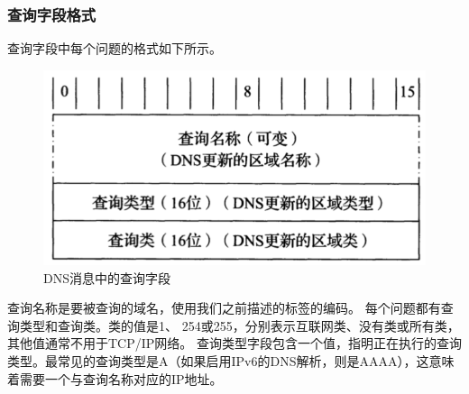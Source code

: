 \documentclass[]{article}
\begin{document}
        \subsubsection{查询字段格式}
            查询字段中每个问题的格式如下所示。
            \begin{figure}[ht]
                \centering
                \includegraphics[scale=0.6]{question.png}
                \caption{DNS消息中的查询字段}
            \end{figure}
            查询名称是要被查询的域名，使用我们之前描述的标签的编码。
            每个问题都有查询类型和查询类。类的值是1、 254或255，分别表示互联网类、没有类或所有类，其他值通常不用于TCP/IP网络。
            查询类型字段包含一个值，指明正在执行的查询类型。最常见的查询类型是A（如果启用IPv6的DNS解析，则是AAAA），这意味着需要一个与查询名称对应的IP地址。
\end{document}
